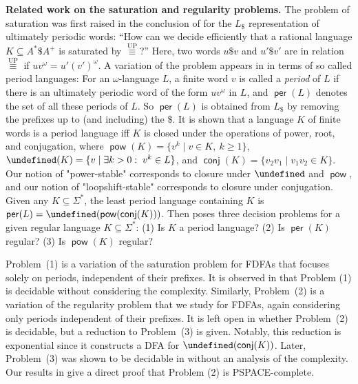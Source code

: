 \documentclass[a4paper,USenglish,cleveref,autoref,thm-restate]{lipics-v2021}
\newcommand{\PSPACE}{\textsf{PSPACE}\xspace}
\let\root\undefined
\begin{document}
\newcommand{\pow}{\operatorname{\mathsf{pow}}}
\newcommand{\root}{\operatorname{\mathsf{root}}}
\newcommand{\conj}{\operatorname{\mathsf{conj}}}
\newcommand{\per}{\operatorname{\mathsf{per}}}
\smallskip 
\noindent\textbf{Related work on the saturation and regularity problems.}
The problem of saturation was first raised in the conclusion of \cite{CalbrixNP93} for the $L_\$$ representation of ultimately periodic words: ``How can we decide efficiently that a rational language $K \subseteq A^*\$ A^+$ is saturated by $\stackrel{\text{UP}}{\equiv}$?'' Here, two words $u\$ v$ and $u'\$ v'$ are in relation $\stackrel{\text{UP}}{\equiv}$ if $uv^\omega = u'(v')^\omega$.
A variation of the problem appears in \cite{CalbrixN95} in terms of so called period languages:
For an $\omega$-language $L$, a finite word $v$ is called a \emph{period} of $L$ if there is an ultimately periodic word of the form $uv^\omega$ in $L$,
and $\per(L)$ denotes the set of all these periods of $L$.
So $\per(L)$ is obtained from $L_\$$ by removing the prefixes up to (and including) the $\$$.
It is shown that a language $K$ of finite words is a period language iff $K$ is closed under the operations of power, root, and conjugation, where $\pow(K) =  \{v^k \mid v \in K,\ k \geq 1\}$, $\root(K) = \{v \mid \exists k>0:\; v^k \in L\}$, and $\conj(K) = \{v_2v_1 \mid v_1v_2 \in K\}$.
Our notion of "power-stable" corresponds to closure under $\root$ and $\pow$, and our notion of "loopshift-stable" corresponds to closure under conjugation.
Given any $K \subseteq \Sigma^*$, the least period language containing $K$ is $\per(L) = \root(\pow(\conj(K)))$. Then \cite{CalbrixN95} poses three decision problems for a given regular language $K \subseteq \Sigma^*$:
(1) Is $K$ a period language?
(2) Is $\per(K)$ regular?
(3) Is $\pow(K)$ regular?


Problem~(1) is a variation of the saturation problem for FDFAs that focuses solely on periods, independent of their prefixes.
It is observed in \cite{CalbrixN95} that Problem (1) is decidable without considering the complexity. Similarly, Problem~(2) is a variation of the regularity problem that we study for FDFAs, again considering only periods independent of their prefixes. It is left open in \cite{CalbrixN95} whether Problem~(2) is decidable, but a reduction to Problem~(3) is given.
Notably, this reduction is exponential since it constructs a DFA for $\root(\conj(K))$. 
Later, Problem~(3) was shown to be decidable in \cite{Fazekas11} without an analysis of the complexity. Our results in  give a direct proof that Problem (2) is \PSPACE-complete.
\end{document}
